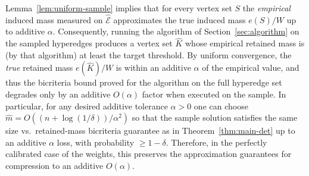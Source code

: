 
Lemma~\ref{lem:uniform-sample} implies that for every vertex set \(S\) the \emph{empirical} induced mass measured on \(\widehat{\mathcal E}\) approximates the true induced mass \(e(S)/W\) up to additive \(\alpha\). Consequently, running the  algorithm of Section~\ref{sec:algorithm} on the sampled hyperedges produces a vertex set \(\widehat K\) whose empirical retained mass is (by that algorithm) at least the target threshold.  By uniform convergence, the \emph{true} retained mass \(e(\widehat K)/W\) is within  an additive \(\alpha\) of the empirical value, and thus the bicriteria bound proved for the algorithm on the full hyperedge set degrades only by an additive \(O(\alpha)\) factor when executed on the sample.  In particular, for any desired additive tolerance \(\alpha>0\) one can choose $\hat{m}=O((n+\log(1/\delta))/\alpha^2) $ %
so that the sample solution satisfies the same size vs.\ retained-mass bicriteria guarantee as in Theorem~\ref{thm:main-det} up to an additive \(\alpha\) loss, with probability \(\ge1-\delta\). Therefore, in the perfectly calibrated case of the weights, this preserves the approximation guarantees for compression to an additive $O(\alpha)$.

